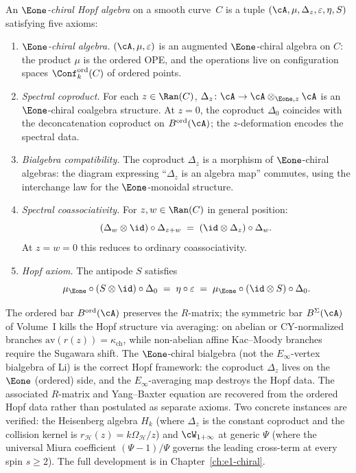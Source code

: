 \begin{definition}
\label{def:e1-chiral-bialgebra-intro}
An \emph{$\Eone$-chiral Hopf algebra} on a smooth curve~$C$
is a tuple
$(\cA, \mu, \Delta_z, \varepsilon, \eta, S)$ satisfying five
axioms:
\begin{enumerate}[label=\textup{(H\arabic*)},topsep=0.3ex,
 itemsep=0.3ex]
\item \emph{$\Eone$-chiral algebra.}
 $(\cA, \mu, \varepsilon)$ is an augmented $\Eone$-chiral
 algebra on $C$: the product $\mu$ is the ordered OPE, and
 the operations live on configuration spaces
 $\Conf_k^{\mathrm{ord}}(C)$ of ordered points.
\item \emph{Spectral coproduct.} For each $z \in \Ran(C)$,
 $\Delta_z \colon \cA \to \cA \otimes_{\Eone, z} \cA$ is an
 $\Eone$-chiral coalgebra structure. At $z = 0$, the coproduct
 $\Delta_0$ coincides with the deconcatenation coproduct on
 $B^{\mathrm{ord}}(\cA)$; the $z$-deformation encodes the
 spectral data.
\item \emph{Bialgebra compatibility.} The coproduct $\Delta_z$
 is a morphism of $\Eone$-chiral algebras: the diagram
 expressing ``$\Delta_z$ is an algebra map'' commutes, using
 the interchange law for the $\Eone$-monoidal structure.
\item \emph{Spectral coassociativity.} For $z, w \in \Ran(C)$
 in general position:
 \[
 (\Delta_w \otimes \id) \circ \Delta_{z+w}
 \;=\; (\id \otimes \Delta_z) \circ \Delta_w.
 \]
 At $z = w = 0$ this reduces to ordinary coassociativity.
\item \emph{Hopf axiom.} The antipode $S$ satisfies
 \[
 \mu_{\Eone} \circ (S \otimes \id) \circ \Delta_0
 \;=\; \eta \circ \varepsilon
 \;=\; \mu_{\Eone} \circ (\id \otimes S) \circ \Delta_0.
 \]
\end{enumerate}
\end{definition}

The ordered bar $B^{\mathrm{ord}}(\cA)$ preserves the
$R$-matrix; the symmetric bar $B^\Sigma(\cA)$ of Volume~I
kills the Hopf structure via averaging: on abelian or CY-normalized
branches $\mathrm{av}(r(z)) = \kappa_{\mathrm{ch}}$, while non-abelian
affine Kac--Moody branches require the Sugawara shift. The
$\Eone$-chiral bialgebra (not the $E_\infty$-vertex bialgebra
of Li) is the correct Hopf framework: the coproduct $\Delta_z$
lives on the $\Eone$ (ordered) side, and the
$E_\infty$-averaging map destroys the Hopf data. The
associated $R$-matrix and Yang--Baxter equation are recovered
from the ordered Hopf data rather than postulated as separate
axioms. Two concrete instances are verified: the Heisenberg
algebra $H_k$ (where $\Delta_z$ is the constant coproduct and
the collision kernel is $r_{\mathcal H}(z)=k\Omega_{\mathcal H}/z$)
and $\cW_{1+\infty}$ at generic $\Psi$ (where
the universal Miura coefficient $(\Psi - 1)/\Psi$ governs the
leading cross-term at every spin $s \geq 2$). The full
development is in Chapter~\ref{ch:e1-chiral}.

